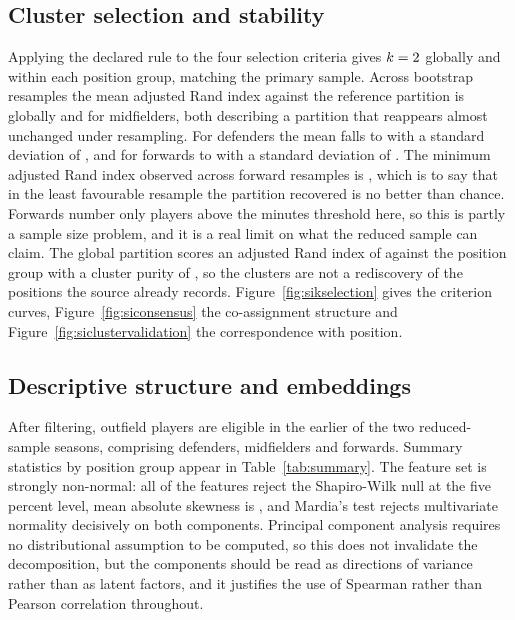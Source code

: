 \subsection{Cluster selection and stability}
\label{sec:si:clustering}

Applying the declared rule to the four selection criteria gives $k=2{}$ globally and
within each position group, matching the primary sample. Across \BootstrapN{} bootstrap
resamples the mean adjusted Rand index against the reference partition is \BootARIGlobal{}
globally and \BootARIMF{} for midfielders, both describing a partition that reappears almost
unchanged under resampling. For defenders the mean falls to \BootARIDF{} with a standard
deviation of \BootARISDDF{}, and for forwards to \BootARIFW{} with a standard deviation of
\BootARISDFW{}. The minimum adjusted Rand index observed across forward resamples is
\BootARIMinFW{}, which is to say that in the least favourable resample the partition recovered
is no better than chance. Forwards number only \NFWPrimary{} players above the minutes threshold
here, so this is partly a sample size problem, and it is a real limit on what the reduced sample
can claim. The global partition scores an adjusted Rand index of \ARIvsPosition{} against the
position group with a cluster purity of \PurityVsPosition{}, so the clusters are not a
rediscovery of the positions the source already records. Figure~\ref{fig:sikselection} gives
the criterion curves, Figure~\ref{fig:siconsensus} the co-assignment structure and
Figure~\ref{fig:siclustervalidation} the correspondence with position.

\subsection{Descriptive structure and embeddings}
\label{sec:si:descriptive}

After filtering, \NEligiblePrimary{} outfield players are eligible in the earlier of the two
reduced-sample seasons, comprising \NDFPrimary{} defenders, \NMFPrimary{} midfielders and
\NFWPrimary{} forwards. Summary statistics by position group appear in Table~\ref{tab:summary}.
The feature set is strongly non-normal: all \NFeaturesRejectNormal{} of the \NFeatures{}
features reject the Shapiro-Wilk null at the five percent level, mean absolute skewness is
\SkewMeanAbs{}, and Mardia's test rejects multivariate normality decisively on both components.
Principal component analysis requires no distributional assumption to be computed, so this does
not invalidate the decomposition, but the components should be read as directions of variance
rather than as latent factors, and it justifies the use of Spearman rather than Pearson
correlation throughout.

